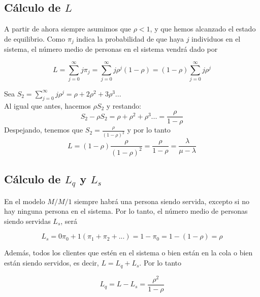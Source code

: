 	\subsection{C\'alculo de $L$}
	A partir de ahora siempre asumimos que $\rho<1$, y que hemos alcanzado el estado de equilibrio. Como $\pi_j$ indica la probabilidad de que haya $j$ individuos en el sistema, el n\'umero medio de personas en el sistema vendr\'a dado por
		\begin{center}
			$$L=\sum_{j=0}^{\infty}j\pi_j=\sum_{j=0}^{\infty}j\rho^j(1-\rho)=(1-\rho)\sum_{j=0}^{\infty} j \rho^j$$
		\end{center}  
	\hspace{0.5cm}Sea $S_2=\displaystyle \sum_{j=0}^{\infty}j\rho^j=\rho+2\rho^2+3\rho^3...$\\
	\hspace{0.5cm}Al igual que antes, hacemos $\rho S_2$ y restando: $$S_2 -\rho S_2=\rho+\rho^2+\rho^3...=\frac{\rho}{1-\rho}$$
	Despejando, tenemos que $S_2=\displaystyle\frac{\rho}{(1-\rho)^2}$ y por lo tanto
		\begin{equation}
			L=(1-\rho)\frac{\rho}{(1-\rho)^2}=\frac{\rho}{1-\rho}=\frac{\lambda}{\mu-\lambda}
		\end{equation}
	
	\subsection{C\'alculo de $L_q$ y $L_s$}
	En el modelo $M/M/1$ siempre habr\'a una persona siendo servida, excepto si no hay ninguna persona en el sistema. Por lo tanto, el n\'umero medio de personas siendo servidas $L_s$, ser\'a
		\begin{center}
			$$L_s=0\pi_0+1(\pi_1+\pi_2+...)=1-\pi_0=1-(1-\rho)=\rho$$
		\end{center}
\hspace{0.5cm}	Adem\'as, todos los clientes que est\'en en el sistema o bien est\'an en la cola o bien est\'an siendo servidos, es decir, $L=L_q+L_s$. Por lo tanto
		\begin{center}
			$$L_q=L-L_s=\frac{\rho^2}{1-\rho}$$
		\end{center}
	
